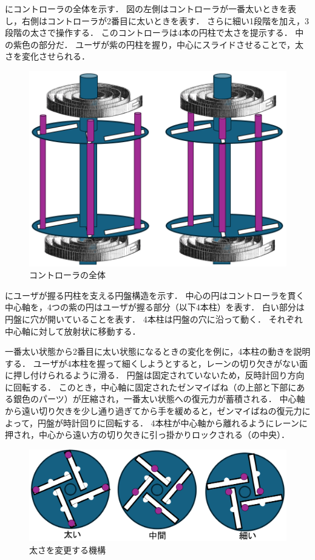 \documentclass[uplatex]{jsarticle}
\begin{document}
にコントローラの全体を示す．
図の左側はコントローラが一番太いときを表し，右側はコントローラが2番目に太いときを表す．
さらに細い1段階を加え，3段階の太さで操作する．
このコントローラは4本の円柱で太さを提示する．
中の紫色の部分だ．
ユーザが紫の円柱を握り，中心にスライドさせることで，太さを変化させられる．

\begin{figure}[htbp]
    \centering
    \includegraphics[width=0.9\linewidth]{fig/横からみた図.png}
    \caption{コントローラの全体}
    \label{fig:Zentai}
\end{figure}

にユーザが握る円柱を支える円盤構造を示す．
中心の円はコントローラを貫く中心軸を，4つの紫の円はユーザが握る部分（以下4本柱）を表す．
白い部分は円盤に穴が開いていることを表す．
4本柱は円盤の穴に沿って動く．
それぞれ中心軸に対して放射状に移動する．

一番太い状態から2番目に太い状態になるときの変化を例に，4本柱の動きを説明する．
ユーザが4本柱を握って細くしようとすると，レーンの切り欠きがない面に押し付けられるように滑る．
円盤は固定されていないため，反時計回り方向に回転する．
このとき，中心軸に固定されたゼンマイばね（の上部と下部にある銀色のパーツ）が圧縮され，一番太い状態への復元力が蓄積される．
中心軸から遠い切り欠きを少し通り過ぎてから手を緩めると，ゼンマイばねの復元力によって，円盤が時計回りに回転する．
4本柱が中心軸から離れるようにレーンに押され，中心から遠い方の切り欠きに引っ掛かりロックされる（の中央）．

\begin{figure}[htbp]
    \centering
    \includegraphics[width=0.9\linewidth]{fig/太さ3段階.png}
    \caption{太さを変更する機構}
    \label{fig:SlashGear}
\end{figure}
\end{document}
